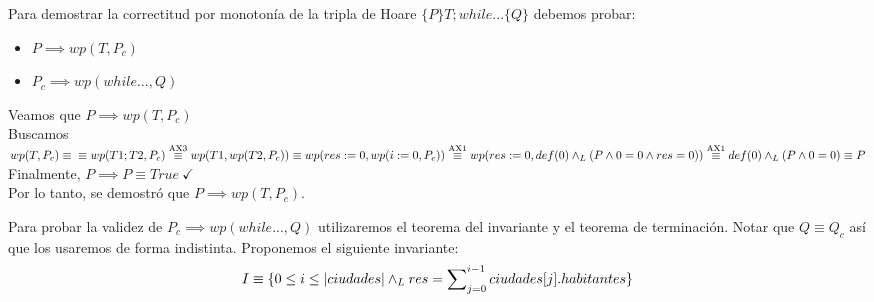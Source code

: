 \documentclass[10pt,a4paper]{article}
\begin{document}
Para demostrar la correctitud por monoton\'ia de la tripla de Hoare $\{P\}T;while...\{Q\}$ debemos probar:
\begin{itemize}
	\item $P \implies wp(T, P_{c})$
	\item $P_{c} \implies wp(while..., Q)$
\end{itemize}

Veamos que $P \implies wp(T, P_{c})$\\
Buscamos $wp(T, P_{c}) \equiv\\
\equiv wp(T1;T2, P_{c})\\
\overset{\text{AX3}}{\equiv} wp(T1, wp(T2, P_{c}))\\
\equiv wp(res := 0, wp(i := 0, P_{c}))\\
\overset{\text{AX1}}{\equiv} wp(res := 0, def(0) \land _L (P \land 0 = 0 \land res = 0))\\
\overset{\text{AX1}}{\equiv} def(0) \land _L (P \land 0 = 0)\\
\equiv P$\\

Finalmente, $P \implies P \equiv True \ \checkmark$\\
Por lo tanto, se demostr\'o que $P \implies wp(T, P_{c})$.
\vspace{0.3cm}

Para probar la validez de $P_{c} \implies wp(while..., Q)$ utilizaremos el teorema del invariante y el teorema de terminaci\'on.
Notar que $Q \equiv Q_{c}$ as\'i que los usaremos de forma indistinta.
Proponemos el siguiente invariante: \\
\begin{equation}
	I \equiv \{0 \le i \le |ciudades| \land _L res = \sum\nolimits_{j=0}^{i - 1} ciudades[j].habitantes\}
\end{equation}
\end{document}
